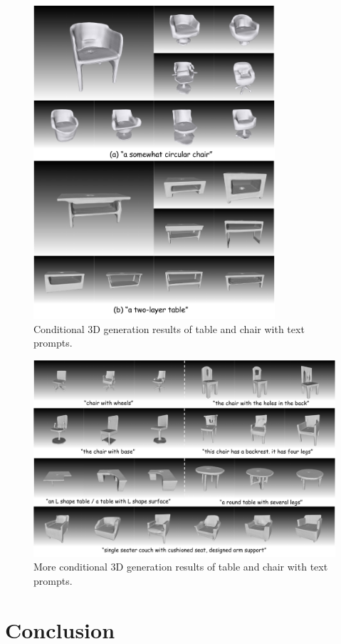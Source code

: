 \documentclass[11pt]{article}
\newcommand\1{\mathds{1}}
\begin{document}
\begin{figure}[htbp]
    \centering
    \includegraphics[width=0.8\textwidth]{imgs/result_text_1.pdf}
    \caption{Conditional 3D generation results of table and chair with text prompts.}
    \label{fig:conditional_text_1}
\end{figure}
\begin{figure}[htbp]
    \centering
    \includegraphics[width=1.0\textwidth]{imgs/result_text_2.pdf}
    \caption{More conditional 3D generation results of table and chair with text prompts.}
    \label{fig:conditional_text_2}
\end{figure}

\section{Conclusion}


 
 
\end{document}
